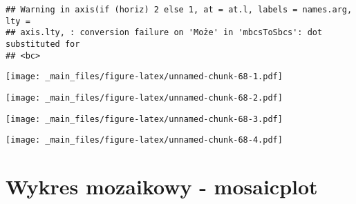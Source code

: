 \documentclass[
]{book}
\newenvironment{Shaded}{\begin{snugshade}}{\end{snugshade}}
\newcommand{\AttributeTok}[1]{\textcolor[rgb]{0.77,0.63,0.00}{#1}}
\newcommand{\ConstantTok}[1]{\textcolor[rgb]{0.00,0.00,0.00}{#1}}
\newcommand{\FunctionTok}[1]{\textcolor[rgb]{0.00,0.00,0.00}{#1}}
\newcommand{\NormalTok}[1]{#1}
\newcommand{\SpecialCharTok}[1]{\textcolor[rgb]{0.00,0.00,0.00}{#1}}
\newcommand{\StringTok}[1]{\textcolor[rgb]{0.31,0.60,0.02}{#1}}
\begin{document}
\begin{verbatim}
## Warning in axis(if (horiz) 2 else 1, at = at.l, labels = names.arg, lty =
## axis.lty, : conversion failure on 'Może' in 'mbcsToSbcs': dot substituted for
## <bc>
\end{verbatim}

\texttt{[image: \_main\_files/figure-latex/unnamed-chunk-68-1.pdf]}

\begin{Shaded}
\end{Shaded}

\texttt{[image: \_main\_files/figure-latex/unnamed-chunk-68-2.pdf]}

\begin{Shaded}
\end{Shaded}

\texttt{[image: \_main\_files/figure-latex/unnamed-chunk-68-3.pdf]}

\begin{Shaded}
\end{Shaded}

\texttt{[image: \_main\_files/figure-latex/unnamed-chunk-68-4.pdf]}

\hypertarget{wykres-mozaikowy---mosaicplot}{%
\section{Wykres mozaikowy - mosaicplot}\label{wykres-mozaikowy---mosaicplot}}
\end{document}
